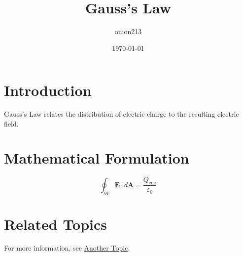 \documentclass{article}
\title{Gauss's Law}
\author{onion213}
\date{\today}
\begin{document}
\maketitle

\section{Introduction}

Gauss's Law relates the distribution of electric charge to the resulting electric field.

\section{Mathematical Formulation}

\begin{equation}
\oint_{\partial V} \mathbf{E} \cdot d\mathbf{A} = \frac{Q_{\text{enc}}}{\varepsilon_0}
\end{equation}

\section{Related Topics}

For more information, see \href{../another/file.tex}{Another Topic}.
\end{document}
